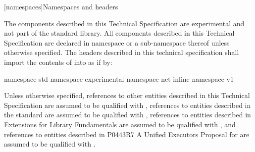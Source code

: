 
[namespaces]{Namespaces and headers}

\pnum
The components described in this Technical Specification are experimental and not part of the \Cpp standard library. All components described in this Technical Specification are declared in namespace  or a sub-namespace thereof unless otherwise specified. The headers described in this technical specification shall import the contents of  into  as if by:

\begin{codeblock}
namespace std {
  namespace experimental {
    namespace net {
      inline namespace v1 {}
    }
  }
}
\end{codeblock}

\pnum
Unless otherwise specified, references to other entities described in this Technical Specification are assumed to be qualified with , references to entities described in the \Cpp standard are assumed to be qualified with , references to entities described in \Cpp Extensions for Library Fundamentals are assumed to be qualified with , and references to entities described in P0443R7 A Unified Executors Proposal for \Cpp are assumed to be qualified with .


